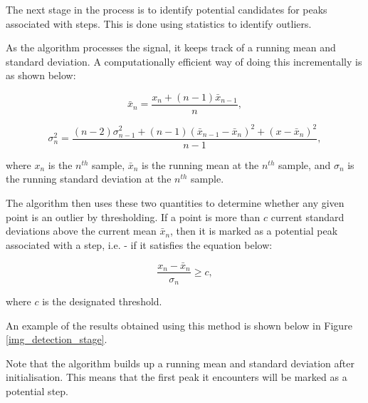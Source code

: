             The next stage in the process is to identify potential candidates for peaks associated with steps. This is done using statistics to identify outliers. 

            As the algorithm processes the signal, it keeps track of a running mean and standard deviation. A computationally efficient way of doing this incrementally is as shown below:

            \begin{equation}
                \bar{x}_n = \frac{x_n + (n-1)\bar{x}_{n-1}}{n},
            \end{equation}

            \begin{equation}
                \sigma_n^2 = \frac
                {(n-2)\sigma_{n-1}^2 + (n-1)(\bar{x}_{n-1} -\bar{x}_n)^2 + (x - \bar{x}_n)^2}
                {n-1},
            \end{equation}

            where $x_n$ is the $n^{th}$ sample, $\bar{x}_n$ is the running mean at the $n^{th}$ sample, and $\sigma_n$ is the running standard deviation at the $n^{th}$ sample.

            The algorithm then uses these two quantities to determine whether any given point is an outlier by thresholding. If a point is more than $c$ current standard deviations above the current mean $\bar{x}_{n}$, then it is marked as a potential peak associated with a step, i.e. - if it satisfies the equation below:

            \begin{equation}
                \frac{x_n - \bar{x}_n}{\sigma_n}\geq c,
            \end{equation}

            where $c$ is the designated threshold.

            An example of the results obtained using this method is shown below in Figure \ref{img_detection_stage}.

            Note that the algorithm builds up a running mean and standard deviation after initialisation. This means that the first peak it encounters will be marked as a potential step.

